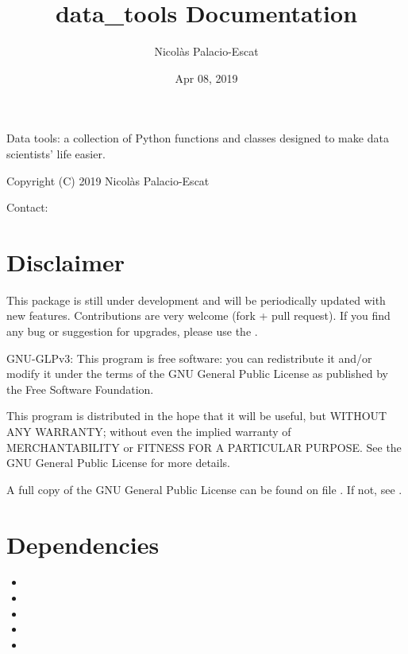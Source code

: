 \documentclass[letterpaper,10pt,english]{sphinxmanual}
\title{data\_tools Documentation}
\date{Apr 08, 2019}
\author{Nicolàs Palacio-Escat}
\begin{document}
\maketitle
\sphinxtableofcontents
{}\label{\detokenize{index::doc}}


Data tools: a collection of Python functions and classes designed to
make data scientists’ life easier.

Copyright (C) 2019 Nicolàs Palacio-Escat

Contact: 


\chapter{Disclaimer}
\label{\detokenize{index:disclaimer}}
This package is still under development and will be periodically updated
with new features. Contributions are very welcome (fork + pull request).
If you find any bug or suggestion for upgrades, please use the
.

GNU-GLPv3:
This program is free software: you can redistribute it and/or modify it
under the terms of the GNU General Public License as published by the
Free Software Foundation.

This program is distributed in the hope that it will be useful, but
WITHOUT ANY WARRANTY; without even the implied warranty of
MERCHANTABILITY or FITNESS FOR A PARTICULAR PURPOSE. See the GNU General
Public License for more details.

A full copy of the GNU General Public License can be found on file
.
If not, see .


\chapter{Dependencies}
\label{\detokenize{index:dependencies}}\begin{itemize}
\item {} 

\item {} 

\item {} 

\item {} 

\item {} 

\end{itemize}
\end{document}
